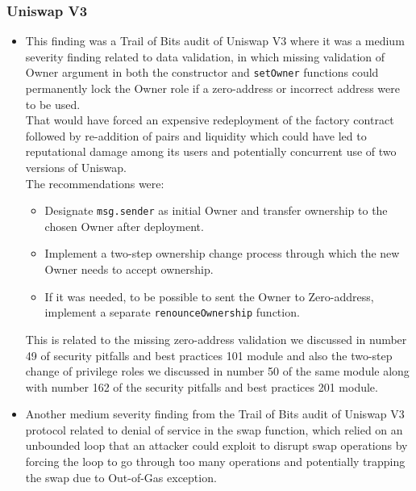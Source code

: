 \subsubsection{Uniswap V3}\label{uniswap-v3}

\begin{itemize}
\item
  This finding was a Trail of Bits audit of Uniswap V3 where it was a
  medium severity finding related to data validation, in which missing
  validation of Owner argument in both the constructor and
  \texttt{setOwner} functions could permanently lock the Owner role if a
  zero-address or incorrect address were to be used.\\

  That would have forced an expensive redeployment of the factory
  contract followed by re-addition of pairs and liquidity which could
  have led to reputational damage among its users and potentially
  concurrent use of two versions of Uniswap.\\

  The recommendations were:

  \begin{itemize}
  \tightlist
  \item
    Designate \texttt{msg.sender} as initial Owner and transfer
    ownership to the chosen Owner after deployment.
  \item
    Implement a two-step ownership change process through which the new
    Owner needs to accept ownership.
  \item
    If it was needed, to be possible to sent the Owner to Zero-address,
    implement a separate \texttt{renounceOwnership} function.
  \end{itemize}

  This is related to the missing zero-address validation we discussed in
  number 49 of security pitfalls and best practices 101 module and also
  the two-step change of privilege roles we discussed in number 50 of
  the same module along with number 162 of the security pitfalls and
  best practices 201 module.
\item
  Another medium severity finding from the Trail of Bits audit of
  Uniswap V3 protocol related to denial of service in the swap function,
  which relied on an unbounded loop that an attacker could exploit to
  disrupt swap operations by forcing the loop to go through too many
  operations and potentially trapping the swap due to Out-of-Gas
  exception.\\


\end{itemize}
